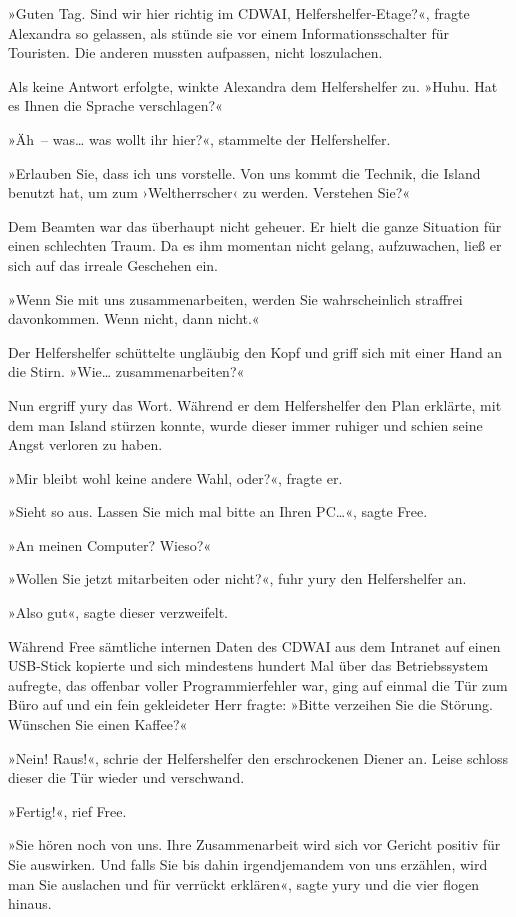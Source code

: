 »Guten Tag. Sind wir hier richtig im CDWAI, Helfershelfer-Etage?«, fragte Alexandra so gelassen, als stünde sie vor einem Informationsschalter für Touristen. Die anderen mussten aufpassen, nicht loszulachen.

Als keine Antwort erfolgte, winkte Alexandra dem Helfershelfer zu. »Huhu. Hat es Ihnen die Sprache verschlagen?«

»Äh~– was… was wollt ihr hier?«, stammelte der Helfershelfer.

»Erlauben Sie, dass ich uns vorstelle. Von uns kommt die Technik, die Island benutzt hat, um zum ›Weltherrscher‹ zu werden. Verstehen Sie?«

Dem Beamten war das überhaupt nicht geheuer. Er hielt die ganze Situation für einen schlechten Traum. Da es ihm momentan nicht gelang, aufzuwachen, ließ er sich auf das irreale Geschehen ein.

»Wenn Sie mit uns zusammenarbeiten, werden Sie wahrscheinlich straffrei davonkommen. Wenn nicht, dann nicht.«

Der Helfershelfer schüttelte ungläubig den Kopf und griff sich mit einer Hand an die Stirn. »Wie… zusammenarbeiten?«

Nun ergriff yury das Wort. Während er dem Helfershelfer den Plan erklärte, mit dem man Island stürzen konnte, wurde dieser immer ruhiger und schien seine Angst verloren zu haben.

»Mir bleibt wohl keine andere Wahl, oder?«, fragte er.

»Sieht so aus. Lassen Sie mich mal bitte an Ihren PC…«, sagte Free.

»An meinen Computer? Wieso?«

»Wollen Sie jetzt mitarbeiten oder nicht?«, fuhr yury den Helfershelfer an.

»Also gut«, sagte dieser verzweifelt.

Während Free sämtliche internen Daten des CDWAI aus dem Intranet auf einen USB-Stick kopierte und sich mindestens hundert Mal über das Betriebssystem aufregte, das offenbar voller Programmierfehler war, ging auf einmal die Tür zum Büro auf und ein fein gekleideter Herr fragte: »Bitte verzeihen Sie die Störung. Wünschen Sie einen Kaffee?«

»Nein! Raus!«, schrie der Helfershelfer den erschrockenen Diener an. Leise schloss dieser die Tür wieder und verschwand.

»Fertig!«, rief Free.

»Sie hören noch von uns. Ihre Zusammenarbeit wird sich vor Gericht positiv für Sie auswirken. Und falls Sie bis dahin irgendjemandem von uns erzählen, wird man Sie auslachen und für verrückt erklären«, sagte yury und die vier flogen hinaus.

